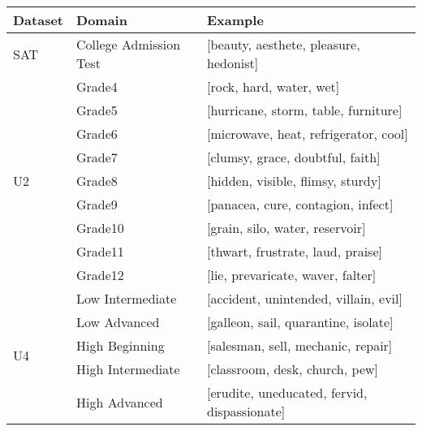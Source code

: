 \documentclass[3p]{elsarticle}
\begin{document}
{\begin{table}[t]
\centering
\begin{tabular}{lll}\toprule
Dataset                 & Domain                  & Example                                                                 \\ \midrule
SAT                     & College Admission Test  & [beauty, aesthete, pleasure, hedonist]                          \\ \midrule
\multirow{9}{*}{U2}     & Grade4                  & [rock, hard, water, wet]                                        \\
                        & Grade5                  & [hurricane, storm, table, furniture]                            \\
                        & Grade6                  & [microwave, heat, refrigerator, cool]                           \\
                        & Grade7                  & [clumsy, grace, doubtful, faith]                                \\
                        & Grade8                  & [hidden, visible, flimsy, sturdy]                               \\
                        & Grade9                  & [panacea, cure, contagion, infect]                              \\
                        & Grade10                 & [grain, silo, water, reservoir]                                 \\
                        & Grade11                 & [thwart, frustrate, laud, praise]                               \\
                        & Grade12                 & [lie, prevaricate, waver, falter]                               \\ \midrule
\multirow{5}{*}{U4}     & Low Intermediate        & [accident, unintended, villain, evil]                           \\
                        & Low Advanced            & [galleon, sail, quarantine, isolate]                            \\
                        & High Beginning          & [salesman, sell, mechanic, repair]                              \\
                        & High Intermediate       & [classroom, desk, church, pew]                                  \\
                        & High Advanced           & [erudite, uneducated, fervid, dispassionate]                    \\ \midrule

\end{tabular}
\end{table}}
\end{document}
